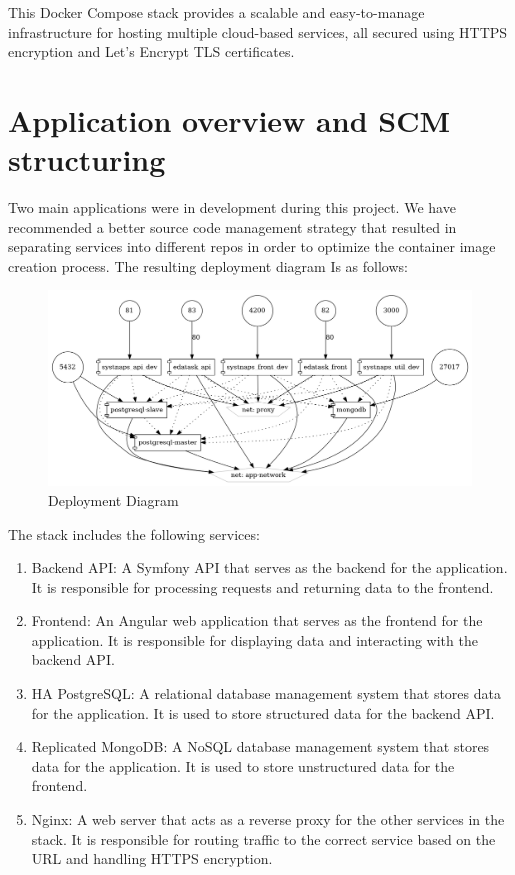 This Docker Compose stack provides a scalable and easy-to-manage infrastructure for hosting multiple cloud-based services, all secured using HTTPS encryption and Let's Encrypt TLS certificates. 




\section{Application overview and SCM structuring}

Two main applications were in development during this project. We have recommended a better source code management strategy that resulted in separating services into different repos in order to optimize the container image creation process. The resulting deployment diagram Is as follows: 

 \begin{figure}[H]\centering
\includegraphics[width=1.0\textwidth,angle=00]{assets/f10.png}
\caption{ Deployment Diagram }
\label{fig:DeploymentDiagram}
\end{figure}

The stack includes the following services: 
\begin{enumerate}
\item Backend API: A Symfony\cite{Symfony} API that serves as the backend for the application. It is responsible for processing requests and returning data to the frontend. 
\item Frontend: An Angular\cite{Angular} web application that serves as the frontend for the application. It is responsible for displaying data and interacting with the backend API. 
\item HA PostgreSQL\cite{PostgreSQL}: A relational database management system that stores data for the application. It is used to store structured data for the backend API. 
\item Replicated MongoDB\cite{MongoDB}: A NoSQL database management system that stores data for the application. It is used to store unstructured data for the frontend. 
\item Nginx\cite{Nginx}: A web server that acts as a reverse proxy for the other services in the stack. It is responsible for routing traffic to the correct service based on the URL and handling HTTPS encryption. 
\end{enumerate}

